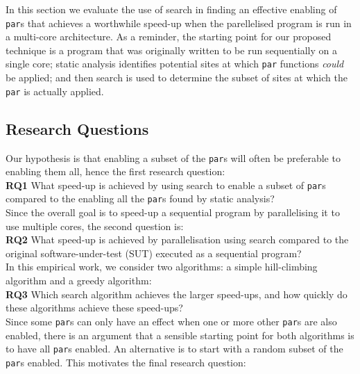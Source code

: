 In this section we evaluate the use of search in finding an effective enabling of \verb-par-s that achieves a worthwhile speed-up when the parellelised program is run in a multi-core architecture.  As a reminder, the starting point for our proposed technique is a program that was originally written to be run sequentially on a single core; static analysis identifies potential sites at which \verb-par- functions \emph{could} be applied; and then search is used to determine the subset of sites at which the \verb-par- is actually applied.


\subsection{Research Questions}

Our hypothesis is that enabling a subset of the \verb-par-s will often be preferable to enabling them all, hence the first research question:\\

\noindent\textbf{RQ1} What speed-up is achieved by using search to enable a subset of \verb-par-s compared to the enabling all the \verb-par-s found by static analysis? \\

Since the overall goal is to speed-up a sequential program by parallelising it to use multiple cores, the second question is:\\

\noindent\textbf{RQ2} What speed-up is achieved by parallelisation using search compared to the original software-under-test (SUT) executed as a sequential program?\\

In this empirical work, we consider two algorithms: a simple hill-climbing algorithm and a greedy algorithm:\\

\noindent\textbf{RQ3} Which search algorithm achieves the larger speed-ups, and how quickly do these algorithms achieve these speed-ups?\\

Since some \verb-par-s can only have an effect when one or more other \verb-par-s are also enabled, there is an argument that a sensible starting point for both algorithms is to have all \verb-par-s enabled.  An alternative is to start with a random subset of the \verb-par-s enabled.  This motivates the final research question:\\


